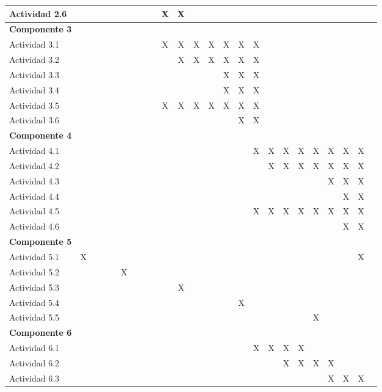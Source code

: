 \documentclass[]{article}
\begin{document}
\begin{table}[!htb]
{\begin{tabular}{|l|c|c|c|c|c|c|c|c|c|c|c|c|c|c|c|c|c|c|c|c|c|c|c|}
    Actividad 2.6 & & & & & & & & & \cellcolor{yellow}X & \cellcolor{yellow}X & & & & & & & & & & & & \\ \hline
    \textbf{Componente 3} & \multicolumn{22}{|l|}{}\\ \hline
    Actividad 3.1 & & & & & & & & & X & X & X & X & X & X & X & & & & & & & \\ \hline
    Actividad 3.2 & & & & & & & & & & X & X & X & X & X & X & & & & & & & \\ \hline
    Actividad 3.3 & & & & & & & & & & & & & X & X & X & & & & & & & \\ \hline
    Actividad 3.4 & & & & & & & & & & & & & X & X & X & & & & & & & \\ \hline
    Actividad 3.5 & & & & & & & & & X & X & X & X & X & X & X & & & & & & & \\ \hline
    Actividad 3.6 & & & & & & & & & & & & & & X & X & & & & & & & \\ \hline
    \textbf{Componente 4} & \multicolumn{22}{|l|}{}\\ \hline
    Actividad 4.1 & & & & & & & & & & & & & & & X & X & X & X & X & X & X & X\\ \hline
    Actividad 4.2 & & & & & & & & & & & & & & & & X & X & X & X & X & X & X\\ \hline
    Actividad 4.3 & & & & & & & & & & & & & & & & & & & & X & X & X \\ \hline
    Actividad 4.4 & & & & & & & & & & & & & & & & & & & & & X & X\\ \hline
    Actividad 4.5 & & & & & & & & & & & & & & & X & X & X & X & X & X & X & X\\ \hline
    Actividad 4.6 & & & & & & & & & & & & & & & & & & & & & X & X\\ \hline
    \textbf{Componente 5} & \multicolumn{22}{|l|}{}\\ \hline
    Actividad 5.1 & X & & & & & & & & & & & & & & & & & & & & & X\\ \hline
    Actividad 5.2 & & & & & X & & & & & & & & & & & & & & & & & \\ \hline
    Actividad 5.3 & & & & & & & & & & X & & & & & & & & & & & & \\ \hline
    Actividad 5.4 & & & & & & & & & & & & & & X & & & & & & & & \\ \hline
    Actividad 5.5 & & & & & & & & & & & & & & & & & & & X & & & \\ \hline
    \textbf{Componente 6} & \multicolumn{22}{|l|}{}\\ \hline
    Actividad 6.1 & & & & & & & & & & & & & & & X & X & X & X & & & & \\ \hline
    Actividad 6.2 & & & & & & & & & & & & & & & & & X & X & X & X & & \\ \hline
    Actividad 6.3 & & & & & & & & & & & & & & & & & & & & X & X & X\\ \hline
\end{tabular}
}
\end{table}
\end{document}
